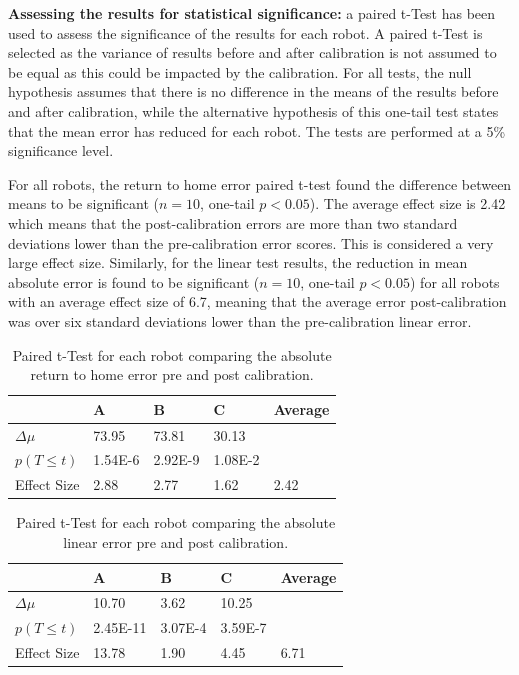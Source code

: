 \documentclass[conference]{IEEEtran}
\begin{document}
\textbf{Assessing the results for statistical significance:} a paired t-Test has been used to assess the significance of the results for each robot. A paired t-Test is selected as the variance of results before and after calibration is not assumed to be equal as this could be impacted by the calibration. For all tests, the null hypothesis assumes that there is no difference in the means of the results before and after calibration, while the alternative hypothesis of this one-tail test states that the mean error has reduced for each robot. The tests are performed at a 5\% significance level.

For all robots, the return to home error paired  t-test found the difference between means to be
significant ($n = 10$, one-tail $p < 0.05$). The average effect size is 2.42 which means that
the post-calibration errors are more than two standard deviations lower than the pre-calibration error scores. This is considered a very large effect size. Similarly, for the linear test results, the reduction in mean absolute error is found to be significant ($n = 10$, one-tail $p < 0.05$) for all robots with an average effect size of 6.7, meaning that the average error post-calibration was over six standard deviations lower than the pre-calibration linear error.



\begin{table}[]
\centering
\caption{Paired t-Test for each robot comparing the absolute return to home error pre and post calibration.}
\label{tab:xy-test}
\begin{tabular}{l|l|l|l|l}
                                         & A       & B       & C       & Average \\ \hline
$\Delta \mu$ & 73.95   & 73.81   & 30.13   &         \\ \hline
$p(T\leq t)$                        & 1.54E-6 & 2.92E-9 & 1.08E-2 &         \\ \hline
Effect Size                              & 2.88    & 2.77    & 1.62    & 2.42   
\end{tabular}
\end{table}


\begin{table}[]
\centering
\caption{Paired t-Test for each robot comparing the absolute linear error pre and post calibration.}
\label{tab:linear-test}
\begin{tabular}{l|l|l|l|l}
                                         & A        & B       & C       & Average \\ \hline
$\Delta \mu$ & 10.70    & 3.62    & 10.25   &         \\ \hline
$p(T\leq t)$                        & 2.45E-11 & 3.07E-4 & 3.59E-7 &         \\ \hline
Effect Size                              & 13.78    & 1.90    & 4.45    & 6.71   
\end{tabular}
\end{table}
\end{document}
